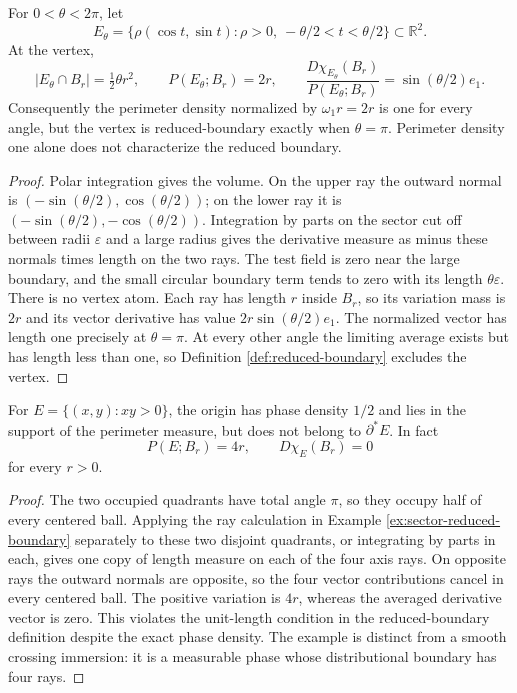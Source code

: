 \begin{example}\label{ex:sector-reduced-boundary}
For $0<\theta<2\pi$, let
\[
 E_\theta=\{\rho(\cos t,\sin t):\rho>0,\ -\theta/2<t<\theta/2\}\subset\mathbb R^2.
\]
At the vertex,
\[
 |E_\theta\cap B_r|=\tfrac12\theta r^2,\qquad
 P(E_\theta;B_r)=2r,\qquad
 \frac{D\chi_{E_\theta}(B_r)}{P(E_\theta;B_r)}
 =\sin(\theta/2)e_1.
\]
Consequently the perimeter density normalized by $\omega_1r=2r$ is one for every angle, but the vertex is reduced-boundary exactly when $\theta=\pi$. Perimeter density one alone does not characterize the reduced boundary.
\end{example}
\begin{proof}
Polar integration gives the volume. On the upper ray the outward normal is $(-\sin(\theta/2),\cos(\theta/2))$; on the lower ray it is $(-\sin(\theta/2),-\cos(\theta/2))$. Integration by parts on the sector cut off between radii $\varepsilon$ and a large radius gives the derivative measure as minus these normals times length on the two rays. The test field is zero near the large boundary, and the small circular boundary term tends to zero with its length $\theta\varepsilon$. There is no vertex atom. Each ray has length $r$ inside $B_r$, so its variation mass is $2r$ and its vector derivative has value $2r\sin(\theta/2)e_1$. The normalized vector has length one precisely at $\theta=\pi$. At every other angle the limiting average exists but has length less than one, so Definition \ref{def:reduced-boundary} excludes the vertex.
\end{proof}

\begin{example}\label{ex:checkerboard-density-half}
For $E=\{(x,y):xy>0\}$, the origin has phase density $1/2$ and lies in the support of the perimeter measure, but does not belong to $\partial^*E$. In fact
\[
 P(E;B_r)=4r,\qquad D\chi_E(B_r)=0
\]
for every $r>0$.
\end{example}
\begin{proof}
The two occupied quadrants have total angle $\pi$, so they occupy half of every centered ball. Applying the ray calculation in Example \ref{ex:sector-reduced-boundary} separately to these two disjoint quadrants, or integrating by parts in each, gives one copy of length measure on each of the four axis rays. On opposite rays the outward normals are opposite, so the four vector contributions cancel in every centered ball. The positive variation is $4r$, whereas the averaged derivative vector is zero. This violates the unit-length condition in the reduced-boundary definition despite the exact phase density. The example is distinct from a smooth crossing immersion: it is a measurable phase whose distributional boundary has four rays.
\end{proof}

